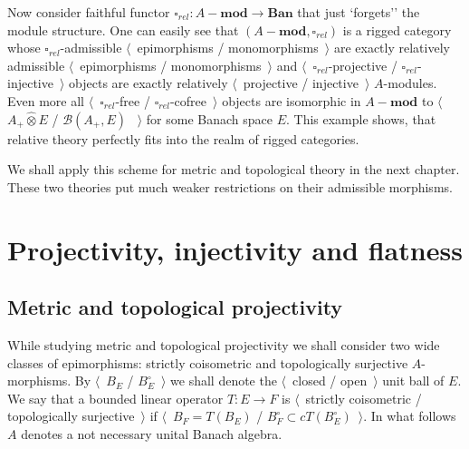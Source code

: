 \documentclass[12pt]{article}
\newcommand{\projtens}{\mathbin{\widehat{\otimes}}}
\begin{document}
Now consider faithful functor $\square_{rel}:A-\mathbf{mod}\to\mathbf{Ban}$ that just `forgets'' the module structure. One can easily see that $(A-\mathbf{mod},\square_{rel})$ is a rigged category whose $\square_{rel}$-admissible $\langle$~epimorphisms / monomorphisms~$\rangle$ are exactly relatively admissible $\langle$~epimorphisms / monomorphisms~$\rangle$ and $\langle$~$\square_{rel}$-projective / $\square_{rel}$-injective~$\rangle$ objects are exactly relatively $\langle$~projective / injective~$\rangle$ $A$-modules. Even more all $\langle$~$\square_{rel}$-free / $\square_{rel}$-cofree~$\rangle$ objects are isomorphic in $A-\mathbf{mod}$ to $\langle$~$A_+\projtens E$ / $\mathcal{B}(A_+,E)$ ~$\rangle$ for some Banach space $E$. This example shows, that relative theory perfectly fits into the realm of rigged categories.

We shall apply this scheme for metric and topological theory in the next chapter. These two theories put much weaker restrictions on their admissible morphisms.


\section{Projectivity, injectivity and flatness}
\label{SectionProjectivityInjectivityAndFlatness}



\subsection{Metric and topological projectivity}
\label{SubSectionMetricAndTopologicalProjectivity}

While studying metric and topological projectivity we shall consider two wide classes of epimorphisms: strictly coisometric and topologically surjective $A$-morphisms. By $\langle$~$B_E$ / $B_E^\circ$~$\rangle$ we shall denote the $\langle$~closed / open~$\rangle$ unit ball of $E$. We say that a bounded linear operator $T:E\to F$ is $\langle$~strictly coisometric / topologically surjective~$\rangle$ if $\langle$~$B_F=T(B_E)$ / $B_F^\circ\subset cT(B_E^\circ)$~$\rangle$. In what follows $A$ denotes a not necessary unital Banach algebra. 
\end{document}
